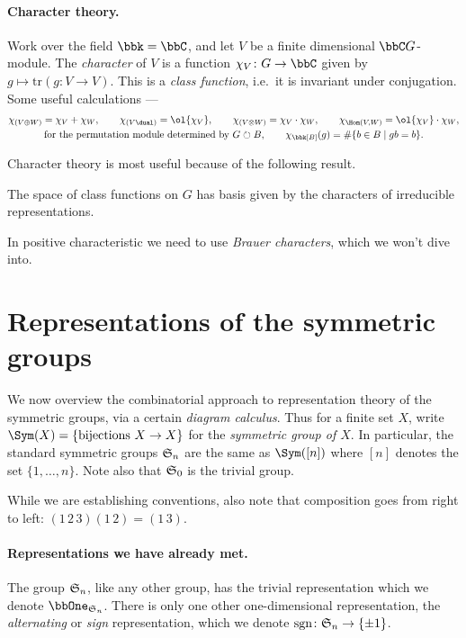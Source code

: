 \paragraph{Character theory.} Work over the field $\bbk = \bbC$, and let $V$ be
a finite dimensional $\bbC G$-module. The \emph{character} of $V$ is a function
$\chi_V\colon G\to \bbC$ given by $g\mapsto \text{tr}(g\colon V\to
V)$. This is a \emph{class function}, i.e.\ it is invariant under conjugation.
Some useful calculations --- 
\begin{gather*}
    \chi_{(V\oplus W)} = \chi_V + \chi_W, \qquad \chi_{(V\dual)} = \ol{\chi_V},
    \qquad \chi_{(V\otimes W)} = \chi_V \cdot \chi_W, \qquad \chi_{\Hom(V,W)} =
    \ol{\chi_V}\cdot \chi_W, \\ 
    \text{for the permutation module determined by }G\circlearrowright B, \qquad
    \chi_{\bbk[B]}(g) =\#\{b\in B\;|\; gb = b\}.
\end{gather*}

Character theory is most useful because of the following result. 

\begin{proposition}
    The space of class functions on $G$ has basis given by the characters of
    irreducible representations.
\end{proposition}

In positive characteristic we need to use \emph{Brauer characters}, which we
won't dive into.

\section{Representations of the symmetric groups}
We now overview the combinatorial approach to representation theory of the
symmetric groups, via a certain \emph{diagram calculus}. Thus for a finite set
$X$, write $\Sym(X)=\{\text{bijections }X\to X\}$ for the \emph{symmetric group
of $X$}. In particular, the standard symmetric groups $\mathfrak{S}_{n}$ are the same as
$\Sym([n])$ where $[n]$ denotes the set $\{1,\ldots, n\}$. Note also that
$\mathfrak{S}_{0}$ is the trivial group.

While we are establishing conventions, also note that composition goes from
right to left: $(1\,2\,3)(1\,2)=(1\,3)$.

\paragraph{Representations we have already met.}
The group $\mathfrak{S}_{n}$, like any other group, has the trivial representation which
we denote $\bbOne_{\sym{n}}$. There is only one other one-dimensional
representation, the \emph{alternating} or \emph{sign} representation, which we
denote $\textnormal{sgn}\colon \mathfrak{S}_{n}\to \{\pm 1\}$.

